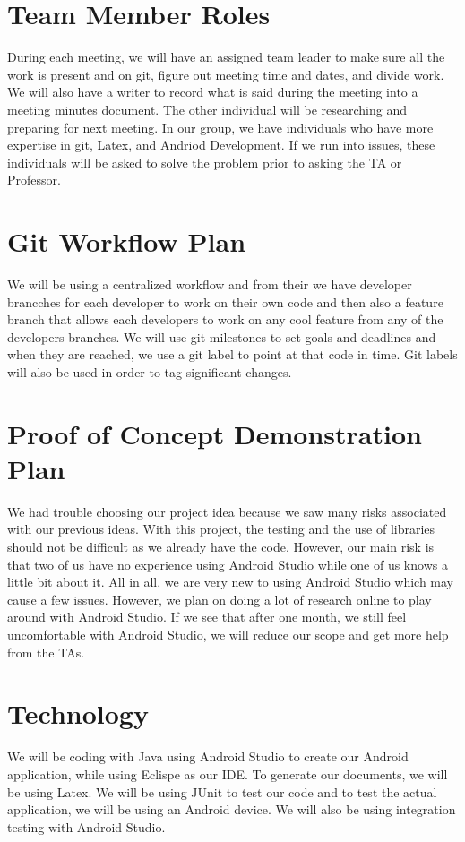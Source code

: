 \documentclass{article}
\begin{document}
\section{Team Member Roles}
During each meeting, we will have an assigned team leader to make sure all the work is present and on git, figure out meeting time and dates, and divide work. We will also have a writer to record what is said during the meeting into a meeting minutes document. The other individual will be researching and preparing for next meeting. In our group, we have individuals who have more expertise in git, Latex, and Andriod Development. If we run into issues, these individuals will be asked to solve the problem prior to asking the TA or Professor. 

\section{Git Workflow Plan}
We will be using a centralized workflow and from their we have developer brancches for each developer to work on their own code and then also a feature branch that allows each developers to work on any cool feature from any of the developers branches. We will use git milestones to set goals and deadlines and when they are reached, we use a git label to point at that code in time. Git labels will also be used in order to tag significant changes.  

\section{Proof of Concept Demonstration Plan}
We had trouble choosing our project idea because we saw many risks associated with our previous ideas. With this project, the testing and the use of libraries should not be difficult as we already have the code. However, our main risk is that two of us have no experience using Android Studio while one of us knows a little bit about it. All in all, we are very new to using Android Studio which may cause a few issues. However, we plan on doing a lot of research online to play around with Android Studio. If we see that after one month, we still feel uncomfortable with Android Studio, we will reduce our scope and get more help from the TAs. 

\section{Technology}
We will be coding with Java using Android Studio to create our Android application, while using Eclispe as our IDE. To generate our documents, we will be using Latex. We will be using JUnit to test our code and to test the actual application, we will be using an Android device. We will also be using integration testing with Android Studio.
\end{document}
